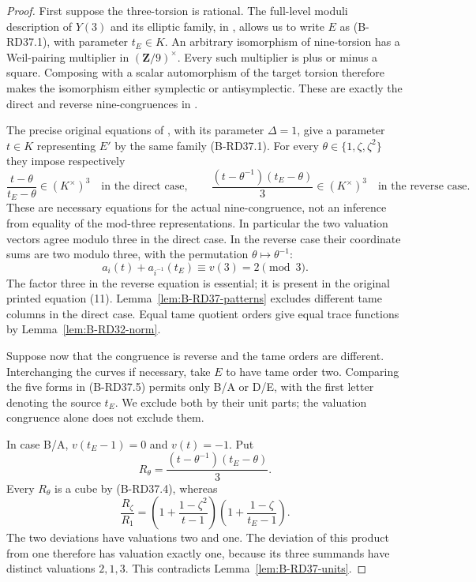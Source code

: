 \begin{proof}
First suppose the three-torsion is rational. The full-level moduli
description of $Y(3)$ and its elliptic family, in
\citet[Section~2, p.~4; Lemma~4.2(i), p.~8]{Fisher2015Nine},
allows us to write $E$ as (B-RD37.1), with parameter $t_E\in K$.
An arbitrary isomorphism of nine-torsion has a Weil-pairing multiplier
in $(\mathbf Z/9)^\times$. Every such multiplier is plus or minus
a square. Composing with a scalar automorphism of the target torsion
therefore makes the isomorphism either symplectic or antisymplectic.
These are exactly the direct and reverse nine-congruences in
\citet[Introduction, p.~1; Section~1, first paragraph, p.~2]
{Fisher2015Nine}.

The precise original equations of
\citet[Theorem~4.3, equations~(10)--(11), pp.~9--10]
{Fisher2015Nine}, with its parameter $\Delta=1$, give a parameter
$t\in K$ representing $E'$ by the same family (B-RD37.1).
For every $\theta\in\{1,\zeta,\zeta^2\}$ they impose respectively
\[
 \frac{t-\theta}{t_E-\theta}\in(K^\times)^3
       \quad\text{in the direct case},
 \qquad
 \frac{(t-\theta^{-1})(t_E-\theta)}3\in(K^\times)^3
       \quad\text{in the reverse case}.
                                                        \tag{B-RD37.4}
\]
These are necessary equations for the actual nine-congruence, not
an inference from equality of the mod-three representations.
In particular the two valuation vectors agree modulo three in the
direct case. In the reverse case their coordinate sums are two
modulo three, with the permutation $\theta\mapsto\theta^{-1}$:
\[
       a_i(t)+a_{i^{-1}}(t_E)\equiv v(3)=2\pmod3.
                                                        \tag{B-RD37.5}
\]
The factor three in the reverse equation is essential; it is
present in the original printed equation (11).
Lemma~\ref{lem:B-RD37-patterns} excludes different tame columns
in the direct case. Equal tame quotient orders give equal trace
functions by Lemma~\ref{lem:B-RD32-norm}.

Suppose now that the congruence is reverse and the tame orders
are different. Interchanging the curves if necessary, take $E$
to have tame order two. Comparing the five forms in (B-RD37.5)
permits only B/A or D/E, with the first letter denoting the
source $t_E$. We exclude both by their unit parts; the valuation
congruence alone does not exclude them.

In case B/A, $v(t_E-1)=0$ and $v(t)=-1$. Put
\[
 R_\theta=\frac{(t-\theta^{-1})(t_E-\theta)}3.
\]
Every $R_\theta$ is a cube by (B-RD37.4), whereas
\[
 \frac{R_\zeta}{R_1}
  =\left(1+\frac{1-\zeta^2}{t-1}\right)
   \left(1+\frac{1-\zeta}{t_E-1}\right).
                                                        \tag{B-RD37.6}
\]
The two deviations have valuations two and one. The deviation of
this product from one therefore has valuation exactly one, because
its three summands have distinct valuations $2,1,3$. This contradicts
Lemma~\ref{lem:B-RD37-units}.


\end{proof}
